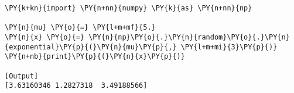 \begin{Verbatim}[label=\makebox{\href{https://bitbucket.org/lbaldini/statnotes/src/master/snippets/np.random.exponential.py}{https://bitbucket.org/.../np.random.exponential.py}},commandchars=\\\{\}]
\PY{k+kn}{import} \PY{n+nn}{numpy} \PY{k}{as} \PY{n+nn}{np}

\PY{n}{mu} \PY{o}{=} \PY{l+m+mf}{5.}
\PY{n}{x} \PY{o}{=} \PY{n}{np}\PY{o}{.}\PY{n}{random}\PY{o}{.}\PY{n}{exponential}\PY{p}{(}\PY{n}{mu}\PY{p}{,} \PY{l+m+mi}{3}\PY{p}{)}
\PY{n+nb}{print}\PY{p}{(}\PY{n}{x}\PY{p}{)}

[Output]
[3.63160346 1.2827318  3.49188566]
\end{Verbatim}
